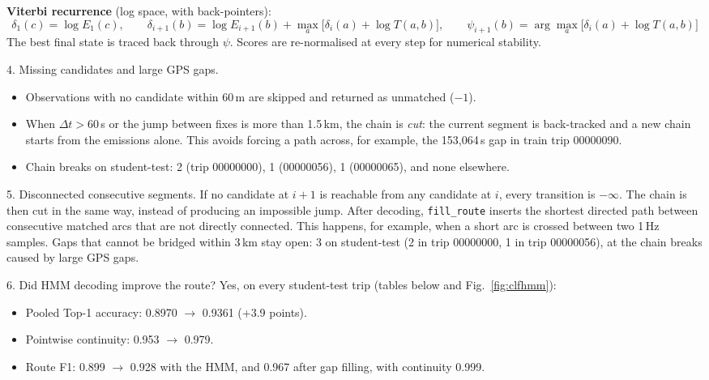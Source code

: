 \documentclass[10pt,a4paper]{article}
\newcommand{\code}[1]{\texttt{\small #1}}
\newenvironment{qa}{\begin{description}[leftmargin=0pt,labelsep=0.4em,itemsep=2pt,font=\bfseries\color{accent!80!black}]}{\end{description}}
\begin{document}
\begin{qa}
\textbf{Viterbi recurrence} (log space, with back-pointers):
\begin{equation*}
\delta_1(c)=\log E_1(c),\qquad \delta_{i+1}(b)=\log E_{i+1}(b)+\max_a\bigl[\delta_i(a)+\log T(a,b)\bigr],\qquad \psi_{i+1}(b)=\arg\max_a\bigl[\delta_i(a)+\log T(a,b)\bigr]
\end{equation*}
The best final state is traced back through $\psi$. Scores are re-normalised at every step for numerical stability.
\item[4. Missing candidates and large GPS gaps.]
\begin{itemize}
  \item Observations with no candidate within 60\,m are skipped and returned as unmatched ($-1$).
  \item When $\Delta t>60$\,s or the jump between fixes is more than 1.5\,km, the chain is \emph{cut}: the current segment is back-tracked and a new chain starts from the emissions alone. This avoids forcing a path across, for example, the 153{,}064\,s gap in train trip 00000090.
  \item Chain breaks on student-test: 2 (trip 00000000), 1 (00000056), 1 (00000065), and none elsewhere.
\end{itemize}
\item[5. Disconnected consecutive segments.] If no candidate at $i+1$ is reachable from any candidate at $i$, every transition is $-\infty$. The chain is then cut in the same way, instead of producing an impossible jump. After decoding, \code{fill\_route} inserts the shortest directed path between consecutive matched arcs that are not directly connected. This happens, for example, when a short arc is crossed between two 1\,Hz samples. Gaps that cannot be bridged within 3\,km stay open: 3 on student-test (2 in trip 00000000, 1 in trip 00000056), at the chain breaks caused by large GPS gaps.
\item[6. Did HMM decoding improve the route?] Yes, on every student-test trip (tables below and Fig.~\ref{fig:clfhmm}):
\begin{itemize}
  \item Pooled Top-1 accuracy: 0.8970 $\rightarrow$ 0.9361 (+3.9 points).
  \item Pointwise continuity: 0.953 $\rightarrow$ 0.979.
  \item Route F1: 0.899 $\rightarrow$ 0.928 with the HMM, and 0.967 after gap filling, with continuity 0.999.
\end{itemize}
\end{qa}
\end{document}
